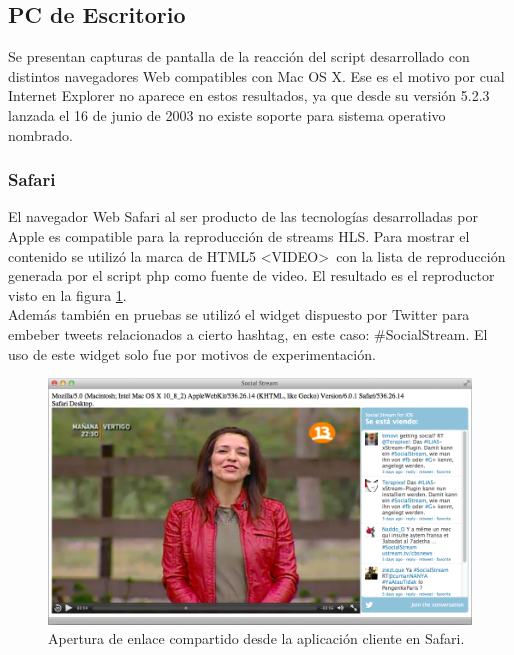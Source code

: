   \subsection{PC de Escritorio}
  Se presentan capturas de pantalla de la reacción del script desarrollado con distintos navegadores Web compatibles con Mac OS X. Ese es el motivo por cual Internet Explorer no aparece en estos resultados, ya que desde su versión 5.2.3 lanzada el 16 de junio de 2003 \cite{bib:mac-iexplorer} no existe soporte para sistema operativo nombrado.

    \subsubsection{Safari}
El navegador Web Safari al ser producto de las tecnologías desarrolladas por Apple es compatible para la reproducción de streams HLS. Para mostrar el contenido se utilizó la marca de HTML5  \textless VIDEO\textgreater \ con la lista de reproducción generada por el script php como fuente de video. El resultado es el reproductor visto en la figura \ref{fig:uagent-safari}.\\

Además también en pruebas se utilizó el widget dispuesto por Twitter \cite{bib:twitter-widget} para embeber tweets relacionados a cierto hashtag, en este caso: \#SocialStream. El uso de este widget solo fue por motivos de experimentación.
\enlargethispage{2\baselineskip}
  \begin{figure}[H]
	\centering
	\includegraphics[scale=0.38]{imgs/uagent-safari.png} 
	\caption{Apertura de enlace compartido desde la aplicación cliente en Safari.}
	\label{fig:uagent-safari}
\end{figure}  
    
